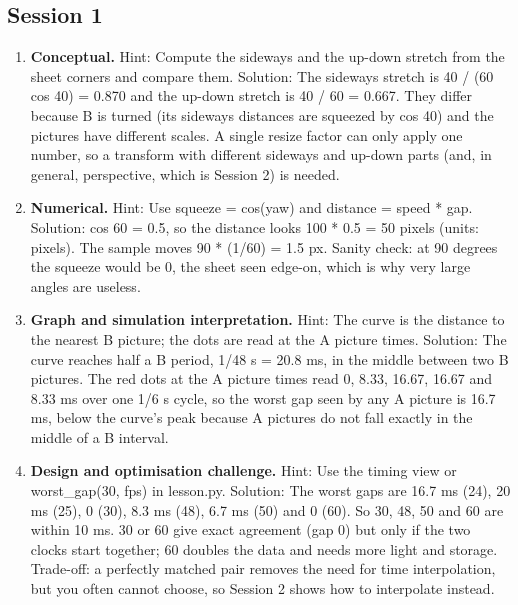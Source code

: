 \documentclass[11pt,a4paper]{article}
\begin{document}
\subsection*{Session 1}
\begin{enumerate}[nosep]
\item \textbf{Conceptual.} Hint: Compute the sideways and the up-down stretch from the sheet corners and compare them. Solution: The sideways stretch is 40 / (60 cos 40) = 0.870 and the up-down stretch is 40 / 60 = 0.667. They differ because B is turned (its sideways distances are squeezed by cos 40) and the pictures have different scales. A single resize factor can only apply one number, so a transform with different sideways and up-down parts (and, in general, perspective, which is Session 2) is needed.
\item \textbf{Numerical.} Hint: Use squeeze = cos(yaw) and distance = speed * gap. Solution: cos 60 = 0.5, so the distance looks 100 * 0.5 = 50 pixels (units: pixels). The sample moves 90 * (1/60) = 1.5 px. Sanity check: at 90 degrees the squeeze would be 0, the sheet seen edge-on, which is why very large angles are useless.
\item \textbf{Graph and simulation interpretation.} Hint: The curve is the distance to the nearest B picture; the dots are read at the A picture times. Solution: The curve reaches half a B period, 1/48 s = 20.8 ms, in the middle between two B pictures. The red dots at the A picture times read 0, 8.33, 16.67, 16.67 and 8.33 ms over one 1/6 s cycle, so the worst gap seen by any A picture is 16.7 ms, below the curve's peak because A pictures do not fall exactly in the middle of a B interval.
\item \textbf{Design and optimisation challenge.} Hint: Use the timing view or worst\_gap(30, fps) in lesson.py. Solution: The worst gaps are 16.7 ms (24), 20 ms (25), 0 (30), 8.3 ms (48), 6.7 ms (50) and 0 (60). So 30, 48, 50 and 60 are within 10 ms. 30 or 60 give exact agreement (gap 0) but only if the two clocks start together; 60 doubles the data and needs more light and storage. Trade-off: a perfectly matched pair removes the need for time interpolation, but you often cannot choose, so Session 2 shows how to interpolate instead.
\end{enumerate}
\end{document}
